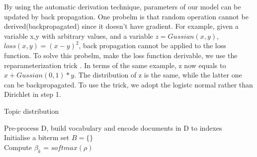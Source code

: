 By using the automatic derivation technique, parameters of our model can be updated by back propagation. One probelm is that random operation cannot be derived(backpropagated) since it doesn't have gradient. For example, given a variable x,y with arbitrary values, and a variable $z = Gussian(x,y)$, $loss(x,y) = (x-y)^2$, back propagation cannot be applied to the loss function. To solve this probelm, make the loss function derivable, we use the reparameterization trick \cite{kingma2013auto}. In terms of the same example, z now equals to $x + Gussian(0,1) * y$. The distribution of z is the same, while the latter one can be backpropagated. To use the trick, we adopt the logistc normal rather than Dirichlet in step 1.
\begin{algorithm}
    \caption{Topic distribution}
    \LinesNumbered 
    Pre-process D, build vocabulary and encode documents in D to indexes \\
    Initialise a biterm set $B = \{\}$ \\
    {
        {
            Compute $\beta_k$ = $softmax(\rho)$
        } 
    }
\end{algorithm}